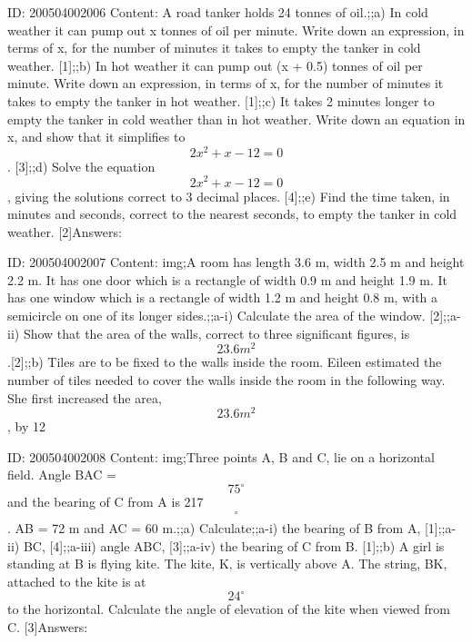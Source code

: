 \documentclass{article}
\begin{document}
ID: 200504002006
Content:
A road tanker holds 24 tonnes of oil.;;a) In cold weather it can pump out x tonnes of oil per minute. Write down an expression, in terms of x, for the number of minutes it takes to empty the tanker in cold weather. [1];;b) In hot weather it can pump out (x + 0.5) tonnes of oil per minute. Write down an expression, in terms of x, for the number of minutes it takes to empty the tanker in hot weather. [1];;c) It takes 2 minutes longer to empty the tanker in cold weather than in hot weather. Write down an equation in x, and show that it simplifies to $$2x^{2} +x-12=0$$. [3];;d) Solve the equation $$2x^{2} +x-12=0$$, giving the solutions correct to 3 decimal places. [4];;e) Find the time taken, in minutes and seconds, correct to the nearest seconds, to empty the tanker in cold weather. [2]Answers:

ID: 200504002007
Content:
img;A room has length 3.6 m, width 2.5 m and height 2.2 m. It has one door which is a rectangle of width 0.9 m and height 1.9 m. It has one window which is a rectangle of width 1.2 m and height 0.8 m, with a semicircle on one of its longer sides.;;a-i) Calculate the area of the window. [2];;a-ii) Show that the area of the walls, correct to three significant figures, is $$23.6 m^{2} $$ .[2];;b) Tiles are to be fixed to the walls inside the room. Eileen estimated the number of tiles needed to cover the walls inside the room in the following way. She first increased the area, $$23.6 m^{2} $$, by 12%

ID: 200504002008
Content:
img;Three points A, B and C, lie on a horizontal field. Angle BAC = $$75^{\circ}$$ and the bearing of C from A is 217$$^{\circ}$$. AB = 72 m and AC = 60 m.;;a) Calculate;;a-i) the bearing of B from A, [1];;a-ii) BC, [4];;a-iii) angle ABC, [3];;a-iv) the bearing of C from B. [1];;b) A girl is standing at B is flying kite. The kite, K, is vertically above A. The string, BK, attached to the kite is at $$24^{\circ}$$ to the horizontal. Calculate the angle of elevation of the kite when viewed from C. [3]Answers:
\end{document}
